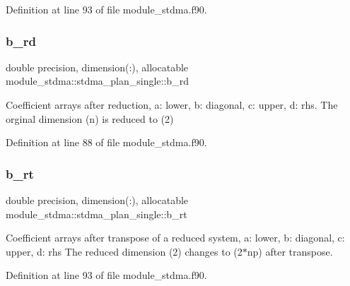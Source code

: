 Definition at line 93 of file module\+\_\+stdma.\+f90.

\mbox{\label{structmodule__stdma_1_1stdma__plan__single_a9123de8148ad2adbe2bb3a5f6defe63e}} 
\subsubsection{\texorpdfstring{b\_rd}{b\_rd}}
{\footnotesize\ttfamily double precision, dimension(\+:), allocatable module\+\_\+stdma\+::stdma\+\_\+plan\+\_\+single\+::b\+\_\+rd}



Coefficient arrays after reduction, a\+: lower, b\+: diagonal, c\+: upper, d\+: rhs. The orginal dimension (n) is reduced to (2) 



Definition at line 88 of file module\+\_\+stdma.\+f90.

\mbox{\label{structmodule__stdma_1_1stdma__plan__single_aee41c7a5aaa557626e4bff5705d0094f}} 
\subsubsection{\texorpdfstring{b\_rt}{b\_rt}}
{\footnotesize\ttfamily double precision, dimension(\+:), allocatable module\+\_\+stdma\+::stdma\+\_\+plan\+\_\+single\+::b\+\_\+rt}



Coefficient arrays after transpose of a reduced system, a\+: lower, b\+: diagonal, c\+: upper, d\+: rhs The reduced dimension (2) changes to (2$\ast$np) after transpose. 



Definition at line 93 of file module\+\_\+stdma.\+f90.

\mbox{\label{structmodule__stdma_1_1stdma__plan__single_a20b32358843fe3ca4e4490297dea3893}} 
